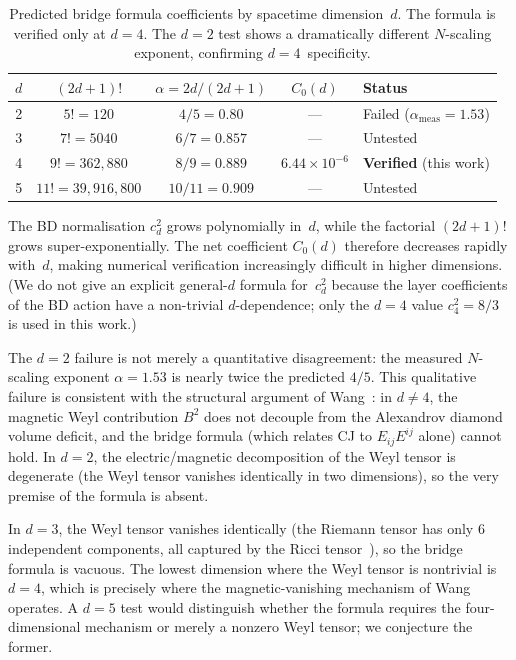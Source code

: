 \documentclass[12pt,a4paper]{article}
\theoremstyle{plain}
\theoremstyle{definition}
\theoremstyle{remark}
\newcommand{\Esq}{E_{ij}E^{ij}}
\begin{document}
\begin{table}[ht]
\centering
\caption{Predicted bridge formula coefficients by spacetime
dimension~$d$.  The formula is verified only at $d = 4$.  The
$d = 2$ test shows a dramatically different $N$-scaling exponent,
confirming $d = 4$~specificity.}
\label{tab:dimension}
\begin{tabular}{ccccl}
\toprule
$d$ & $(2d+1)!$ & $\alpha = 2d/(2d+1)$
    & $C_0(d)$ & Status \\
\midrule
2 & $5! = 120$ & $4/5 = 0.80$
    & --- & Failed ($\alpha_{\mathrm{meas}} = 1.53$) \\
3 & $7! = 5040$ & $6/7 = 0.857$
    & --- & Untested \\
4 & $9! = 362{,}880$ & $8/9 = 0.889$
    & $6.44 \times 10^{-6}$ & \textbf{Verified} (this work) \\
5 & $11! = 39{,}916{,}800$ & $10/11 = 0.909$
    & --- & Untested \\
\bottomrule
\end{tabular}
\end{table}

The BD normalisation $c_d^2$ grows polynomially in~$d$, while the
factorial $(2d+1)!$ grows super-exponentially.  The net
coefficient $C_0(d)$ therefore decreases rapidly with~$d$, making
numerical verification increasingly difficult in higher
dimensions.  (We do not give an explicit general-$d$ formula
for~$c_d^2$ because the layer coefficients of the BD action have a
non-trivial $d$-dependence; only the $d = 4$ value
$c_4^2 = 8/3$ is used in this work.)

The $d = 2$ failure is not merely a quantitative disagreement:
the measured $N$-scaling exponent $\alpha = 1.53$ is nearly twice
the predicted $4/5$.  This qualitative failure is consistent with
the structural argument of Wang~\cite{Wang:2019}: in $d \neq 4$,
the magnetic Weyl contribution $B^2$ does not decouple from the
Alexandrov diamond volume deficit, and the bridge formula (which
relates CJ to $\Esq$ alone) cannot hold.  In $d = 2$, the
electric/magnetic decomposition of the Weyl tensor is degenerate
(the Weyl tensor vanishes identically in two dimensions), so the
very premise of the formula is absent.

In $d = 3$, the Weyl tensor vanishes identically (the Riemann
tensor has only 6 independent components, all captured by the
Ricci tensor~\cite{Wald:1984}), so the bridge formula is vacuous.
The lowest dimension where the Weyl tensor is nontrivial is
$d = 4$, which is precisely where the magnetic-vanishing mechanism
of Wang~\cite{Wang:2019} operates.  A $d = 5$ test would
distinguish whether the formula requires the four-dimensional
mechanism or merely a nonzero Weyl tensor; we conjecture the
former.
\end{document}

